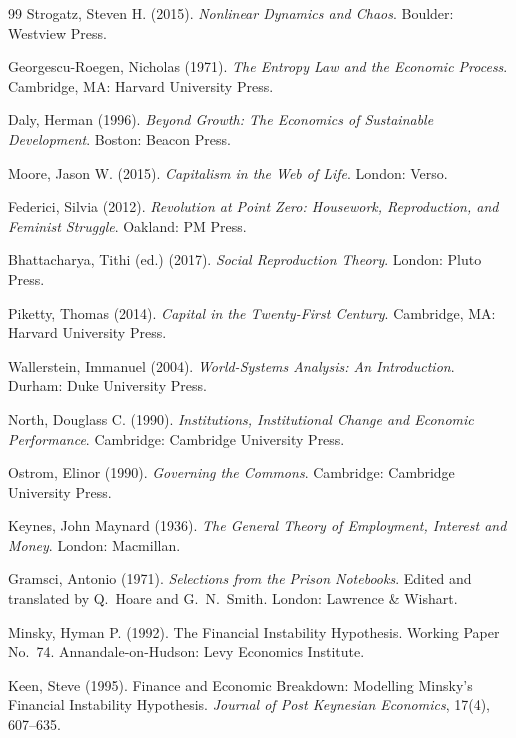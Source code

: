 \documentclass[12pt,a4paper]{article}
\theoremstyle{definition}
\theoremstyle{remark}
\begin{document}
\begin{thebibliography}{99}
Strogatz, Steven H. (2015).
\textit{Nonlinear Dynamics and Chaos}.
Boulder: Westview Press.

Georgescu-Roegen, Nicholas (1971).
\textit{The Entropy Law and the Economic Process}.
Cambridge, MA: Harvard University Press.

Daly, Herman (1996).
\textit{Beyond Growth: The Economics of Sustainable Development}.
Boston: Beacon Press.

Moore, Jason W. (2015).
\textit{Capitalism in the Web of Life}.
London: Verso.

Federici, Silvia (2012).
\textit{Revolution at Point Zero: Housework, Reproduction, and Feminist Struggle}.
Oakland: PM Press.

Bhattacharya, Tithi (ed.) (2017).
\textit{Social Reproduction Theory}.
London: Pluto Press.

Piketty, Thomas (2014).
\textit{Capital in the Twenty-First Century}.
Cambridge, MA: Harvard University Press.

Wallerstein, Immanuel (2004).
\textit{World-Systems Analysis: An Introduction}.
Durham: Duke University Press.

North, Douglass C. (1990).
\textit{Institutions, Institutional Change and Economic Performance}.
Cambridge: Cambridge University Press.

Ostrom, Elinor (1990).
\textit{Governing the Commons}.
Cambridge: Cambridge University Press.

Keynes, John Maynard (1936).
\textit{The General Theory of Employment, Interest and Money}.
London: Macmillan.

Gramsci, Antonio (1971).
\textit{Selections from the Prison Notebooks}.
Edited and translated by Q.\ Hoare and G.\ N.\ Smith.
London: Lawrence \& Wishart.

Minsky, Hyman P. (1992).
The Financial Instability Hypothesis.
Working Paper No.~74. Annandale-on-Hudson: Levy Economics Institute.

Keen, Steve (1995).
Finance and Economic Breakdown: Modelling Minsky's Financial Instability Hypothesis.
\textit{Journal of Post Keynesian Economics}, 17(4), 607--635.

\end{thebibliography}
\end{document}
